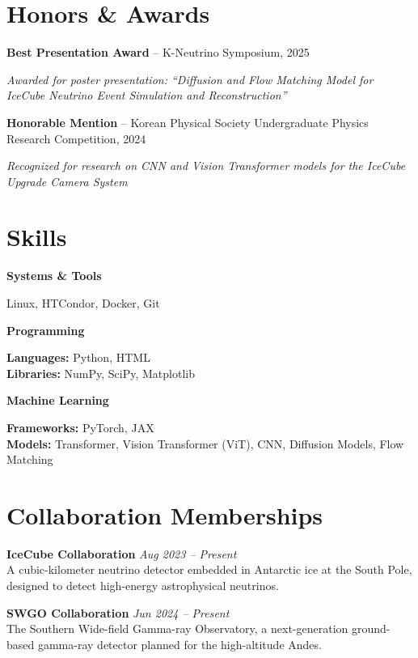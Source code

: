 \documentclass[11pt, a4paper]{article}
\newcommand{\skillbox}[2]{
    \begin{tcolorbox}[
        colback=lightgray,
        colframe=primary,
        boxrule=0pt,
        leftrule=3pt,
        arc=0pt,
        left=5pt,
        right=5pt,
        top=5pt,
        bottom=5pt
    ]
    \textbf{\large #1}

    #2
    \end{tcolorbox}
    \vspace{3pt}
}
\newcommand{\awarditem}[3]{
    \noindent
    \begin{minipage}[t]{0.9\textwidth}
        \textbf{#1} -- #2
        
        {\small\textit{#3}}
    \end{minipage}
    \vspace{6pt}
}
\begin{document}
\section{Honors \& Awards}

\awarditem{Best Presentation Award}{K-Neutrino Symposium, 2025}{Awarded for poster presentation: ``Diffusion and Flow Matching Model for IceCube Neutrino Event Simulation and Reconstruction''}

\awarditem{Honorable Mention}{Korean Physical Society Undergraduate Physics Research Competition, 2024}{Recognized for research on CNN and Vision Transformer models for the IceCube Upgrade Camera System}

\section{Skills}
\skillbox{Systems \& Tools}{
    Linux, HTCondor, Docker, Git
}
\skillbox{Programming}{
    \textbf{Languages:} Python, HTML \\
    \textbf{Libraries:} NumPy, SciPy, Matplotlib
}
\skillbox{Machine Learning}{
    \textbf{Frameworks:} PyTorch, JAX \\
    \textbf{Models:} Transformer, Vision Transformer (ViT), CNN, Diffusion Models, Flow Matching
}

\section{Collaboration Memberships}

\begin{tcolorbox}[
    colback=lightgray,
    colframe=primary,
    boxrule=0pt,
    leftrule=3pt,
    arc=0pt,
    left=5pt, right=5pt, top=6pt, bottom=6pt
]
\textbf{IceCube Collaboration} \hfill \textit{Aug 2023 -- Present} \\[2pt]
{\small A cubic-kilometer neutrino detector embedded in Antarctic ice at the South Pole, designed to detect high-energy astrophysical neutrinos.}
\end{tcolorbox}
\vspace{3pt}

\begin{tcolorbox}[
    colback=lightgray,
    colframe=primary,
    boxrule=0pt,
    leftrule=3pt,
    arc=0pt,
    left=5pt, right=5pt, top=6pt, bottom=6pt
]
\textbf{SWGO Collaboration} \hfill \textit{Jun 2024 -- Present} \\[2pt]
{\small The Southern Wide-field Gamma-ray Observatory, a next-generation ground-based gamma-ray detector planned for the high-altitude Andes.}
\end{tcolorbox}
\end{document}
